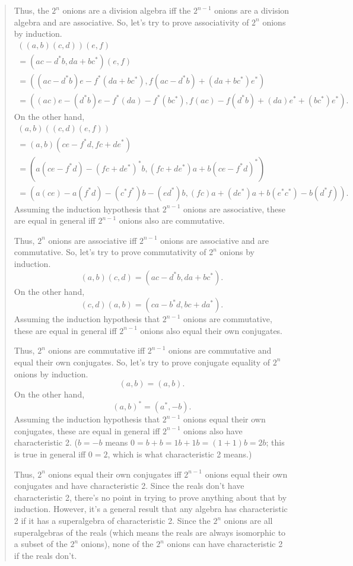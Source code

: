 \documentclass{article}
\begin{document}
\begin{quote}
Thus, the \(2^n\) onions are a division algebra iff the \(2^{n-1}\)
onions are a division algebra and are associative. So, let's try to
prove associativity of \(2^n\) onions by induction. \[
  \begin{gathered}
    ((a, b) (c, d)) (e, f)
  \\= (a c - d^* b, d a + b c^*) (e, f)
  \\= ((a c - d^* b) e - f^* (d a + b c^*), f (a c - d^* b) + (d a + b c^*) e^*)
  \\=((ac)e - (d^* b)e - f^* (da) - f^* (b c^*), f(ac) - f(d^* b) + (da) e^* + (b c^*) e^*).
  \end{gathered}
\] On the other hand, \[
  \begin{gathered}
    (a, b) ((c, d) (e, f))
  \\= (a, b) (c e - f^* d, f c + d e^*)
  \\= (a (c e - f^* d) - (f c + d e^*)^* b, (f c + d e^*) a + b (c e - f^* d)^*)
  \\= (a(ce) - a(f^* d) - (c^* f^*)b - (e d^*)b, (fc)a + (d e^*)a + b(e^* c^*) - b(d^* f)).
  \end{gathered}
\] Assuming the induction hypothesis that \(2^{n-1}\) onions are
associative, these are equal in general iff \(2^{n-1}\) onions also are
commutative.

Thus, \(2^n\) onions are associative iff \(2^{n-1}\) onions are
associative and are commutative. So, let's try to prove commutativity of
\(2^n\) onions by induction.
\[(a, b) (c, d) = (a c - d^* b, d a + b c^*).\] On the other hand,
\[(c, d) (a, b) = (c a - b^* d, b c + d a^*).\] Assuming the induction
hypothesis that \(2^{n-1}\) onions are commutative, these are equal in
general iff \(2^{n-1}\) onions also equal their own conjugates.

Thus, \(2^n\) onions are commutative iff \(2^{n-1}\) onions are
commutative and equal their own conjugates. So, let's try to prove
conjugate equality of \(2^n\) onions by induction. \[(a, b) = (a, b).\]
On the other hand, \[(a, b)^* = (a^*, -b).\] Assuming the induction
hypothesis that \(2^{n-1}\) onions equal their own conjugates, these are
equal in general iff \(2^{n-1}\) onions also have characteristic 2.
(\(b = -b\) means \(0 = b + b = 1 b + 1 b = (1 + 1) b = 2 b\); this is
true in general iff \(0 = 2\), which is what characteristic 2 means.)

Thus, \(2^n\) onions equal their own conjugates iff \(2^{n-1}\) onions
equal their own conjugates and have characteristic 2. Since the reals
don't have characteristic 2, there's no point in trying to prove
anything about that by induction. However, it's a general result that
any algebra has characteristic 2 if it has a superalgebra of
characteristic 2. Since the \(2^n\) onions are all superalgebras of the
reals (which means the reals are always isomorphic to a subset of the
\(2^n\) onions), none of the \(2^n\) onions can have characteristic 2 if
the reals don't.


\end{quote}
\end{document}
